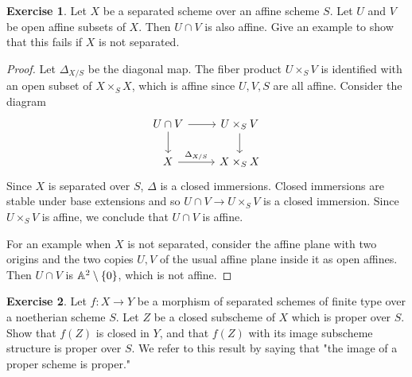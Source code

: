 \documentclass[11pt]{book}
\theoremstyle{definition}
\newtheorem{exercise}{Exercise}[section]
\begin{document}
\begin{exercise}
Let $X$ be a separated scheme over an affine scheme $S$. Let $U$ and $V$ be open affine subsets of $X$. Then $U\cap V$ is also affine. Give an example to show that this fails if $X$ is not separated.
\end{exercise}
\begin{proof}
Let $\Delta_{X/S}$ be the diagonal map. The fiber product $U\times_SV$ is identified with an open subset of $X\times_SX$, which is affine since $U,V,S$ are all affine. Consider the diagram
\[\begin{tikzcd}
U\cap V\ar[r]\ar[d]&U\times_SV\ar[d]\\
X\ar[r,"\Delta_{X/S}"]&X\times_SX
\end{tikzcd}\]
Since $X$ is separated over $S$, $\Delta$ is a closed immersions. Closed immersions are stable under base extensions and so $U\cap V\to U\times_SV$ is a closed immersion. Since $U\times_SV$ is affine, we conclude that $U\cap V$ is affine.\par
For an example when $X$ is not separated, consider the affine plane with two origins and the two copies $U,V$ of the usual affine plane inside it as open affines. Then $U\cap V$ is $\mathbb{A}^2\setminus\{0\}$, which is not affine.
\end{proof}
\begin{exercise}
Let $f:X\to Y$ be a morphism of separated schemes of finite type over a noetherian scheme $S$. Let $Z$ be a closed subscheme of $X$ which is proper over $S$. Show that $f(Z)$ is closed in $Y$, and that $f(Z)$ with its image subscheme structure is proper over $S$. We refer to this result by saying that "the image of a proper scheme is proper."
\end{exercise}
\end{document}
